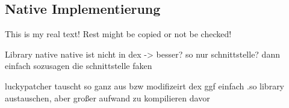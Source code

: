 \subsection{Native Implementierung} \label{subsection:counter-modifications-dynamic}
This is my real text! Rest might be copied or not be checked!


Library native\newline
native ist nicht in dex -> besser?\newline
so nur schnittstelle? dann einfach sozusagen die schnittstelle faken\newline

luckypatcher tauscht so ganz aus bzw modifizeirt dex\newline
ggf einfach .so library austauschen, aber großer aufwand zu kompilieren davor\newline
